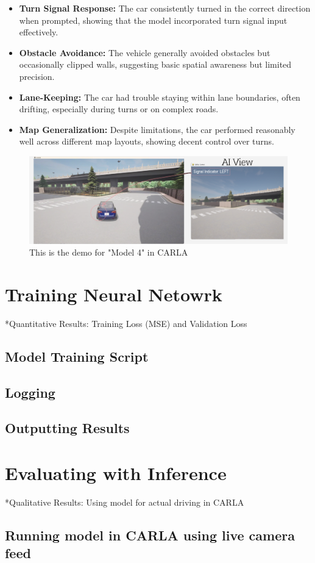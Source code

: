\documentclass{article} %
\begin{document}
\begin{itemize}
  \item \textbf{Turn Signal Response:} The car consistently turned in the correct direction when prompted, showing that the model incorporated turn signal input effectively.

  \item \textbf{Obstacle Avoidance:} The vehicle generally avoided obstacles but occasionally clipped walls, suggesting basic spatial awareness but limited precision.

  \item \textbf{Lane-Keeping:} The car had trouble staying within lane boundaries, often drifting, especially during turns or on complex roads.

  \item \textbf{Map Generalization:} Despite limitations, the car performed reasonably well across different map layouts, showing decent control over turns.
\end{itemize}


\begin{figure}[H] %
    \centering
    \includegraphics[width=1.0\textwidth]{model4demo.png} %
    \caption{This is the demo for "Model 4" in CARLA}
    \label{fig:model4demo}
\end{figure}


\section{Training Neural Netowrk}

*Quantitative Results: Training Loss (MSE) and Validation Loss

\subsection{Model Training Script}

\subsection{Logging}

\subsection{Outputting Results}



\section{Evaluating with Inference}

*Qualitative Results: Using model for actual driving in CARLA

\subsection{Running model in CARLA using live camera feed}
\end{document}
